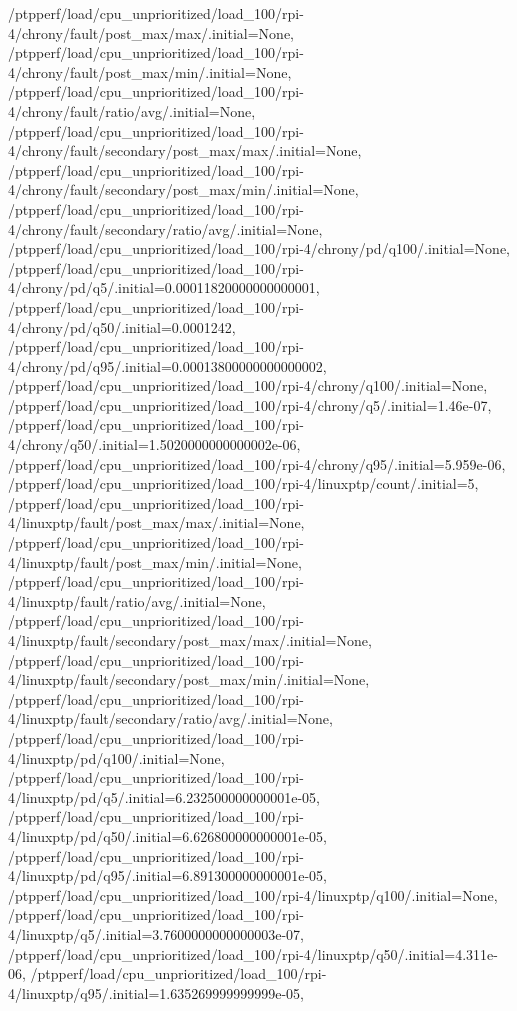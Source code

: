 {    /ptpperf/load/cpu_unprioritized/load_100/rpi-4/chrony/fault/post_max/max/.initial=None,
    /ptpperf/load/cpu_unprioritized/load_100/rpi-4/chrony/fault/post_max/min/.initial=None,
    /ptpperf/load/cpu_unprioritized/load_100/rpi-4/chrony/fault/ratio/avg/.initial=None,
    /ptpperf/load/cpu_unprioritized/load_100/rpi-4/chrony/fault/secondary/post_max/max/.initial=None,
    /ptpperf/load/cpu_unprioritized/load_100/rpi-4/chrony/fault/secondary/post_max/min/.initial=None,
    /ptpperf/load/cpu_unprioritized/load_100/rpi-4/chrony/fault/secondary/ratio/avg/.initial=None,
    /ptpperf/load/cpu_unprioritized/load_100/rpi-4/chrony/pd/q100/.initial=None,
    /ptpperf/load/cpu_unprioritized/load_100/rpi-4/chrony/pd/q5/.initial=0.00011820000000000001,
    /ptpperf/load/cpu_unprioritized/load_100/rpi-4/chrony/pd/q50/.initial=0.0001242,
    /ptpperf/load/cpu_unprioritized/load_100/rpi-4/chrony/pd/q95/.initial=0.00013800000000000002,
    /ptpperf/load/cpu_unprioritized/load_100/rpi-4/chrony/q100/.initial=None,
    /ptpperf/load/cpu_unprioritized/load_100/rpi-4/chrony/q5/.initial=1.46e-07,
    /ptpperf/load/cpu_unprioritized/load_100/rpi-4/chrony/q50/.initial=1.5020000000000002e-06,
    /ptpperf/load/cpu_unprioritized/load_100/rpi-4/chrony/q95/.initial=5.959e-06,
    /ptpperf/load/cpu_unprioritized/load_100/rpi-4/linuxptp/count/.initial=5,
    /ptpperf/load/cpu_unprioritized/load_100/rpi-4/linuxptp/fault/post_max/max/.initial=None,
    /ptpperf/load/cpu_unprioritized/load_100/rpi-4/linuxptp/fault/post_max/min/.initial=None,
    /ptpperf/load/cpu_unprioritized/load_100/rpi-4/linuxptp/fault/ratio/avg/.initial=None,
    /ptpperf/load/cpu_unprioritized/load_100/rpi-4/linuxptp/fault/secondary/post_max/max/.initial=None,
    /ptpperf/load/cpu_unprioritized/load_100/rpi-4/linuxptp/fault/secondary/post_max/min/.initial=None,
    /ptpperf/load/cpu_unprioritized/load_100/rpi-4/linuxptp/fault/secondary/ratio/avg/.initial=None,
    /ptpperf/load/cpu_unprioritized/load_100/rpi-4/linuxptp/pd/q100/.initial=None,
    /ptpperf/load/cpu_unprioritized/load_100/rpi-4/linuxptp/pd/q5/.initial=6.232500000000001e-05,
    /ptpperf/load/cpu_unprioritized/load_100/rpi-4/linuxptp/pd/q50/.initial=6.626800000000001e-05,
    /ptpperf/load/cpu_unprioritized/load_100/rpi-4/linuxptp/pd/q95/.initial=6.891300000000001e-05,
    /ptpperf/load/cpu_unprioritized/load_100/rpi-4/linuxptp/q100/.initial=None,
    /ptpperf/load/cpu_unprioritized/load_100/rpi-4/linuxptp/q5/.initial=3.7600000000000003e-07,
    /ptpperf/load/cpu_unprioritized/load_100/rpi-4/linuxptp/q50/.initial=4.311e-06,
    /ptpperf/load/cpu_unprioritized/load_100/rpi-4/linuxptp/q95/.initial=1.635269999999999e-05,
}
